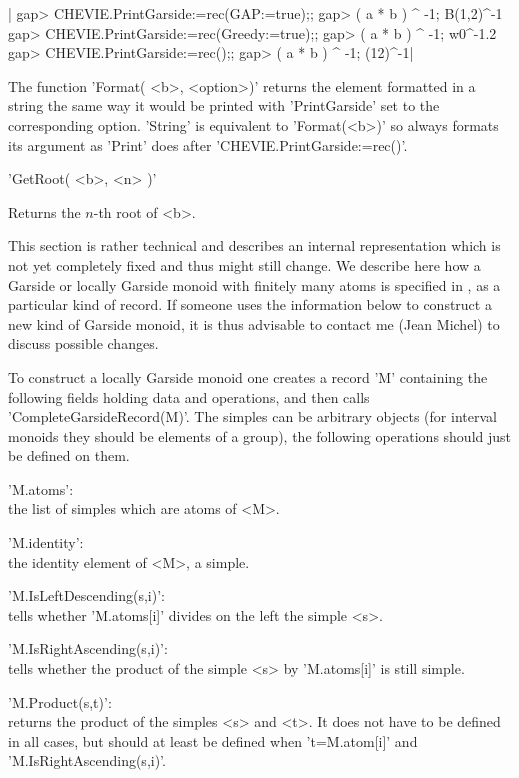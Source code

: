 |    gap> CHEVIE.PrintGarside:=rec(GAP:=true);;
    gap> ( a * b ) ^ -1;
    B(1,2)^-1
    gap> CHEVIE.PrintGarside:=rec(Greedy:=true);;
    gap> ( a * b ) ^ -1;
    w0^-1.2
    gap> CHEVIE.PrintGarside:=rec();;
    gap> ( a * b ) ^ -1;
    (12)^-1|

The  function 'Format( <b>,  <option>)' returns the  element formatted in a
string  the same  way it  would be  printed with  'PrintGarside' set to the
corresponding  option. 'String'  is equivalent  to 'Format(<b>)'  so always
formats its argument as 'Print' does after 'CHEVIE.PrintGarside:=rec()'.

'GetRoot( <b>, <n> )'

Returns the $n$-th root of <b>.


This  section is rather technical  and describes an internal representation
which  is not yet completely fixed and thus might still change. We describe
here  how a Garside or  locally Garside monoid with  finitely many atoms is
specified  in \CHEVIE, as a particular kind  of record. If someone uses the
information  below to construct  a new kind  of Garside monoid,  it is thus
advisable  to  contact  me  (Jean  Michel)  to discuss possible changes. 

To  construct a locally Garside monoid  one creates a record 'M' containing
the   following  fields  holding  data   and  operations,  and  then  calls
'CompleteGarsideRecord(M)'.  The  simples  can  be  arbitrary  objects (for
interval  monoids  they  should  be  elements  of  a  group), the following
operations should just be defined on them.

'M.atoms':\\ the list of simples which are atoms of <M>.

'M.identity':\\ the identity element of <M>, a simple.

'M.IsLeftDescending(s,i)':\\ tells whether 'M.atoms[i]' divides on the left
the simple <s>.

'M.IsRightAscending(s,i)':\\ tells whether the product of the simple <s> by
'M.atoms[i]' is still simple.

'M.Product(s,t)':\\ returns the product of the simples <s> and <t>. It does
not  have to be defined  in all cases, but  should at least be defined when
't=M.atom[i]' and 'M.IsRightAscending(s,i)'.

